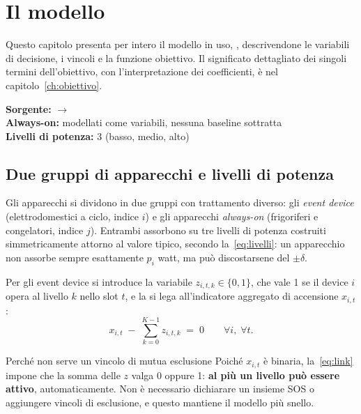 \chapter{Il modello}
\label{ch:modelli}

Questo capitolo presenta per intero il modello in uso, , descrivendone
le variabili di decisione, i vincoli e la funzione obiettivo. Il significato dettagliato dei
singoli termini dell'obiettivo, con l'interpretazione dei coefficienti, è nel
capitolo~\ref{ch:obiettivo}.

\medskip
\noindent\textbf{Sorgente:}  $\rightarrow$
\\
\textbf{Always-on:} modellati come variabili, nessuna baseline sottratta\\
\textbf{Livelli di potenza:} 3 (basso, medio, alto)

\section{Due gruppi di apparecchi e livelli di potenza}

Gli apparecchi si dividono in due gruppi con trattamento diverso: gli \emph{event device}
(elettrodomestici a ciclo, indice $i$) e gli apparecchi \emph{always-on} (frigoriferi e
congelatori, indice $j$). Entrambi assorbono su tre livelli di potenza costruiti simmetricamente
attorno al valore tipico, secondo la~\eqref{eq:livelli}: un apparecchio non assorbe sempre
esattamente $p_i$ watt, ma può discostarsene del $\pm\delta$.

Per gli event device si introduce la variabile $z_{i,t,k} \in \{0,1\}$, che vale 1 se il device
$i$ opera al livello $k$ nello slot $t$, e la si lega all'indicatore aggregato di accensione
$x_{i,t}$:
\begin{equation}
  x_{i,t} \;-\; \sum_{k=0}^{K-1} z_{i,t,k} \;=\; 0
  \qquad \forall i,\; \forall t .
  \label{eq:link}
\end{equation}

\begin{notebox}{Perché non serve un vincolo di mutua esclusione}
Poiché $x_{i,t}$ è binaria, la~\eqref{eq:link} impone che la somma delle $z$ valga 0 oppure 1:
\textbf{al più un livello può essere attivo}, automaticamente. Non è necessario dichiarare un
insieme SOS o aggiungere vincoli di esclusione, e questo mantiene il modello più snello.
\end{notebox}

